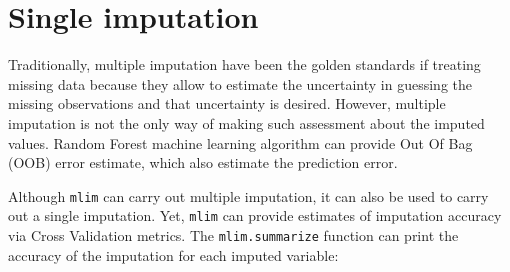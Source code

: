 \section{Single imputation}

Traditionally, multiple imputation have been the golden standards if treating missing data because they allow to estimate the uncertainty in guessing the missing observations and that uncertainty is desired. However, multiple imputation is not the only way of making such assessment about the imputed values. Random Forest machine learning algorithm can provide Out Of Bag (OOB) error estimate, which also estimate the prediction error. 

Although \texttt{mlim} can carry out multiple imputation, it can also be used to carry out a single imputation. Yet, \texttt{mlim} can provide estimates of imputation accuracy via Cross Validation metrics. The \texttt{mlim.summarize} function can print the accuracy of the imputation for each imputed variable:

